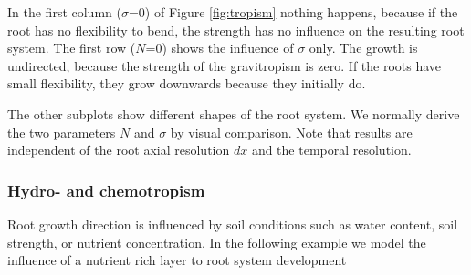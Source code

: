 In the first column ($\sigma$=0) of Figure \ref{fig:tropism} nothing happens, because if the root has no flexibility to bend, the strength has no influence on the resulting root system. The first row ($N$=0) shows the influence of $\sigma$ only. The growth is undirected, because the strength of the gravitropism is zero. If the roots have small flexibility, they grow downwards because they initially do. 

The other subplots show different shapes of the root system. We normally derive the two parameters $N$ and $\sigma$ by visual comparison. Note that results are independent of the root axial resolution $dx$ and the temporal resolution.
% 



\subsubsection*{Hydro- and chemotropism} 


Root growth direction is influenced by soil conditions such as water content, soil strength, or nutrient concentration. In the following example we model the influence of a nutrient rich layer to root system development



